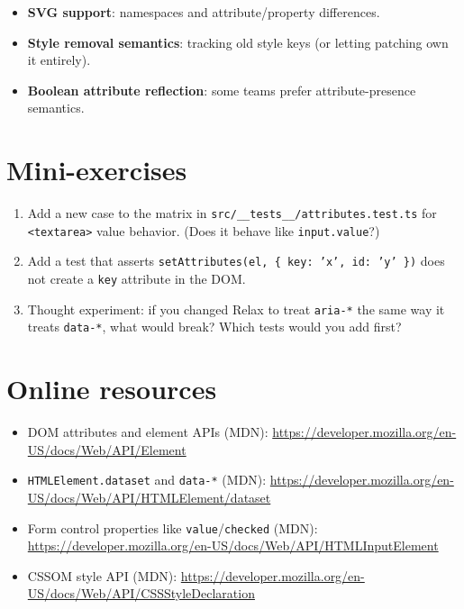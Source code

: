 \begin{itemize}
  \item \textbf{SVG support}: namespaces and attribute/property differences.
  \item \textbf{Style removal semantics}: tracking old style keys (or letting patching own it entirely).
  \item \textbf{Boolean attribute reflection}: some teams prefer attribute-presence semantics.
\end{itemize}

\section{Mini-exercises}
\begin{enumerate}
  \item Add a new case to the matrix in \texttt{src/\_\_tests\_\_/attributes.test.ts} for \texttt{<textarea>} value behavior. (Does it behave like \texttt{input.value}?)
  \item Add a test that asserts \texttt{setAttributes(el, \{ key: 'x', id: 'y' \})} does not create a \texttt{key} attribute in the DOM.
  \item Thought experiment: if you changed Relax to treat \texttt{aria-*} the same way it treats \texttt{data-*}, what would break? Which tests would you add first?
\end{enumerate}

\section{Online resources}
\begin{itemize}
  \item DOM attributes and element APIs (MDN): \href{https://developer.mozilla.org/en-US/docs/Web/API/Element}{https://developer.mozilla.org/en-US/docs/Web/API/Element}
  \item \texttt{HTMLElement.dataset} and \texttt{data-*} (MDN): \href{https://developer.mozilla.org/en-US/docs/Web/API/HTMLElement/dataset}{https://developer.mozilla.org/en-US/docs/Web/API/HTMLElement/dataset}
  \item Form control properties like \texttt{value}/\texttt{checked} (MDN): \href{https://developer.mozilla.org/en-US/docs/Web/API/HTMLInputElement}{https://developer.mozilla.org/en-US/docs/Web/API/HTMLInputElement}
  \item CSSOM style API (MDN): \href{https://developer.mozilla.org/en-US/docs/Web/API/CSSStyleDeclaration}{https://developer.mozilla.org/en-US/docs/Web/API/CSSStyleDeclaration}
\end{itemize}
